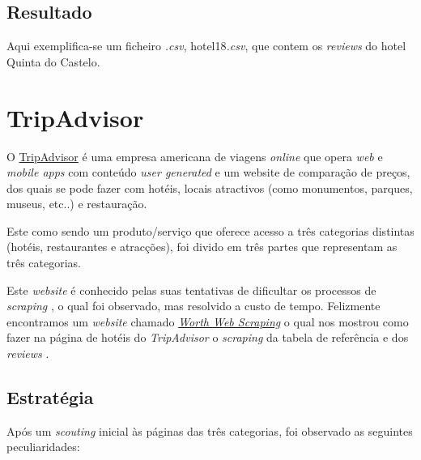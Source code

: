 \subsection{Resultado}

Aqui exemplifica-se um ficheiro \textit{.csv}, hotel18\textit{.csv}, que contem os \textit{reviews} do hotel Quinta do Castelo.


\section{TripAdvisor}

O \href{https://www.tripadvisor.pt/}{TripAdvisor} é uma empresa americana de viagens \textit{online} que opera \textit{web} e \textit{mobile apps} com conteúdo \textit{user generated} e um website de comparação de preços, dos quais se pode fazer com hotéis, locais atractivos (como monumentos, parques, museus, etc..) e restauração.

Este como sendo um produto/serviço que oferece acesso a três categorias distintas (hotéis, restaurantes e atracções), foi divido em três partes que representam as três categorias.

Este \textit{website} é conhecido pelas suas tentativas de dificultar os processos de \textit{scraping} \cite{wws1}, o qual foi observado, mas resolvido a custo de tempo. Felizmente encontramos um \textit{website} chamado \href{https://www.worthwebscraping.com/}{\textit{Worth Web Scraping}} o qual nos mostrou como fazer na página de hotéis do \textit{TripAdvisor} o \textit{scraping} da tabela de referência e dos \textit{reviews} \cite{wws2}.

\subsection{Estratégia}

Após um \textit{scouting} inicial às páginas das três categorias, foi observado as seguintes peculiaridades:

